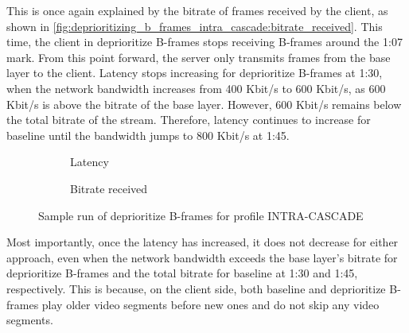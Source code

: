 This is once again explained by the bitrate of frames received by the client, as shown in \autoref{fig:deprioritizing_b_frames_intra_cascade:bitrate_received}. This time, the client in deprioritize B-frames stops receiving B-frames around the 1:07 mark. From this point forward, the server only transmits frames from the base layer to the client. Latency stops increasing for deprioritize B-frames at 1:30, when the network bandwidth increases from 400 Kbit/s to 600 Kbit/s, as 600 Kbit/s is above the bitrate of the base layer. %
However, 600 Kbit/s remains below the total bitrate of the stream. Therefore, latency continues to increase for baseline until the bandwidth jumps to 800 Kbit/s at 1:45.

\begin{figure}
    \centering
    \begin{subfigure}{\textwidth}
        \centering
        
        \vspace{1em}
        \caption{Latency}
        \label{fig:deprioritizing_b_frames_intra_cascade:latency}
    \end{subfigure}

    \vspace{1.5em}

    \begin{subfigure}{\textwidth}
        \centering
        
        \vspace{1em}
        \caption{Bitrate received}
        \label{fig:deprioritizing_b_frames_intra_cascade:bitrate_received}
    \end{subfigure}

    \vspace{1.5em}

    \caption{Sample run of deprioritize B-frames for profile INTRA-CASCADE}
\end{figure}

Most importantly, once the latency has increased, it does not decrease for either approach, even when the network bandwidth exceeds the base layer's bitrate for deprioritize B-frames and the total bitrate for baseline at 1:30 and 1:45, respectively. This is because, on the client side, both baseline and deprioritize B-frames play older video segments before new ones and do not skip any video segments. 

